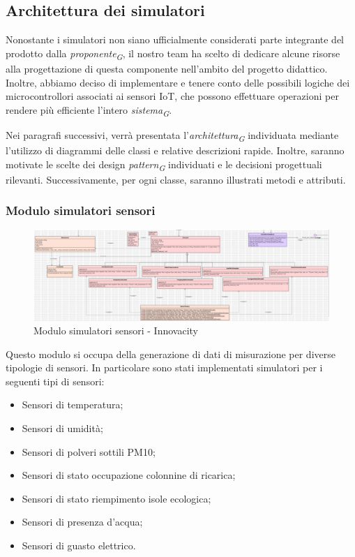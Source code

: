 \subsection{Architettura dei simulatori} \label{sec:architettura_simulatori}
Nonostante i simulatori non siano ufficialmente considerati parte integrante del prodotto dalla \textit{proponente}\textsubscript{\textit{G}}, il nostro team ha scelto di dedicare alcune risorse alla progettazione di questa componente nell'ambito del progetto didattico. Inoltre, abbiamo deciso di implementare e tenere conto delle possibili logiche dei microcontrollori associati ai sensori IoT, che possono effettuare operazioni per rendere più efficiente l'intero \textit{sistema}\textsubscript{\textit{G}}.

Nei paragrafi successivi, verrà presentata l'\textit{architettura}\textsubscript{\textit{G}} individuata mediante l'utilizzo di diagrammi delle classi e relative descrizioni rapide. Inoltre, saranno motivate le scelte dei design \textit{pattern}\textsubscript{\textit{G}} individuati e le decisioni progettuali rilevanti. Successivamente, per ogni classe, saranno illustrati metodi e attributi.
\subsubsection{Modulo simulatori sensori}
\begin{figure}[H]
    \centering
    \includegraphics[width=1\textwidth]{../Images/SpecificaTecnica/simulatoriSensori.PNG}
    \caption{Modulo simulatori sensori - Innovacity}
    \label{fig: Modulo_simulatori_sensori}
\end{figure}
Questo modulo si occupa della generazione di dati di misurazione per diverse tipologie di sensori.
In particolare sono stati implementati simulatori per i seguenti tipi di sensori:
\begin{itemize}
    \item Sensori di temperatura;
    \item Sensori di umidità;
    \item Sensori di polveri sottili PM10;
    \item Sensori di stato occupazione colonnine di ricarica;
    \item Sensori di stato riempimento isole ecologica;
    \item Sensori di presenza d'acqua;
    \item Sensori di guasto elettrico.
\end{itemize}
